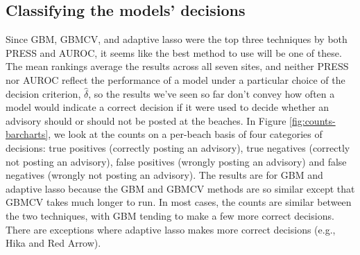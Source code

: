 \documentclass[english]{article}\usepackage[]{graphicx}\usepackage[]{color}
\numberwithin{equation}{section}
\numberwithin{figure}{section}
\renewcommand\[{\begin{equation}}
\renewcommand\]{\end{equation}}
\begin{document}
\subsection{Classifying the models' decisions}

Since GBM, GBMCV, and adaptive lasso were the top three techniques
by both PRESS and AUROC, it seems like the best method to use will
be one of these. The mean rankings average the results across all
seven sites, and neither PRESS nor AUROC reflect the performance of
a model under a particular choice of the decision criterion, $\hat{\delta}$,
so the results we've seen so far don't convey how often a model would
indicate a correct decision if it were used to decide whether an advisory
should or should not be posted at the beaches. In Figure \ref{fig:counts-barcharts},
we look at the counts on a per-beach basis of four categories of decisions:
true positives (correctly posting an advisory), true negatives (correctly
not posting an advisory), false positives (wrongly posting an advisory)
and false negatives (wrongly not posting an advisory). The results
are for GBM and adaptive lasso because the GBM and GBMCV methods are
so similar except that GBMCV takes much longer to run. In most cases,
the counts are similar between the two techniques, with GBM tending
to make a few more correct decisions. There are exceptions where adaptive
lasso makes more correct decisions (e.g., Hika and Red Arrow).
\end{document}
